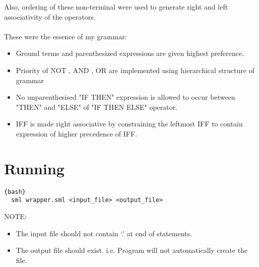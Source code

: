 \documentclass{article}
\begin{document}
Also, ordering of these non-terminal were used to generate right and left associativity of the operators.\\
\\
These were the essence of my grammar:
\begin{itemize}
  \item Ground terms and parenthesized expressions are given highest preference.
  \item Priority of NOT , AND , OR are implemented using hierarchical structure of grammar
  \item No unparenthesised "IF THEN" expression is allowed to occur between "THEN" and "ELSE" of
  "IF THEN ELSE" operator.
  \item IFF is made right associative by constraining the leftmost IFF to contain expression of higher
  precedence of IFF.
\end{itemize}

\section{Running}
\begin{lstlisting}{bash}
  sml wrapper.sml <input_file> <output_file>
\end{lstlisting}

NOTE:
\begin{itemize}
\item The input file should not contain `.' at end of statements.
\item The output file should exist. i.e. Program will not automatically create the file.
\end{itemize}
\end{document}
